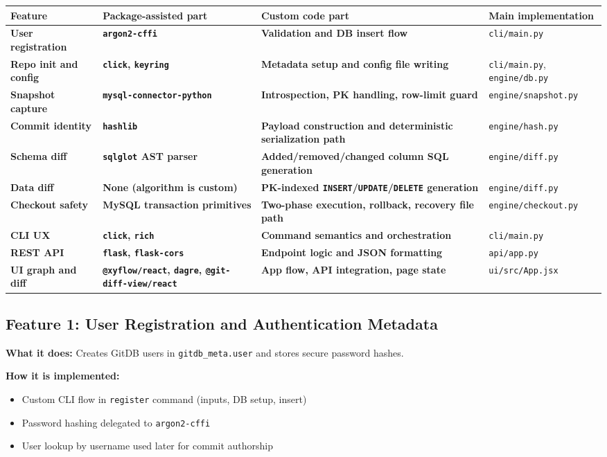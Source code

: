 \documentclass[12pt, a4paper]{article}
\begin{document}
\begin{center}
\renewcommand{\arraystretch}{1.35}
\begin{tabularx}{\textwidth}{>{\bfseries}p{3.0cm} >{\bfseries}p{3.2cm} >{\bfseries}p{3.2cm} X}
\toprule
Feature & Package-assisted part & Custom code part & Main implementation \\
\midrule
User registration & \texttt{argon2-cffi} & Validation and DB insert flow & \texttt{cli/main.py} \\
Repo init and config & \texttt{click}, \texttt{keyring} & Metadata setup and config file writing & \texttt{cli/main.py}, \texttt{engine/db.py} \\
Snapshot capture & \texttt{mysql-connector-python} & Introspection, PK handling, row-limit guard & \texttt{engine/snapshot.py} \\
Commit identity & \texttt{hashlib} & Payload construction and deterministic serialization path & \texttt{engine/hash.py} \\
Schema diff & \texttt{sqlglot} AST parser & Added/removed/changed column SQL generation & \texttt{engine/diff.py} \\
Data diff & None (algorithm is custom) & PK-indexed \texttt{INSERT}/\texttt{UPDATE}/\texttt{DELETE} generation & \texttt{engine/diff.py} \\
Checkout safety & MySQL transaction primitives & Two-phase execution, rollback, recovery file path & \texttt{engine/checkout.py} \\
CLI UX & \texttt{click}, \texttt{rich} & Command semantics and orchestration & \texttt{cli/main.py} \\
REST API & \texttt{flask}, \texttt{flask-cors} & Endpoint logic and JSON formatting & \texttt{api/app.py} \\
UI graph and diff & \texttt{@xyflow/react}, \texttt{dagre}, \texttt{@git-diff-view/react} & App flow, API integration, page state & \texttt{ui/src/App.jsx} \\
\bottomrule
\end{tabularx}
\end{center}

\subsection{Feature 1: User Registration and Authentication Metadata}

\textbf{What it does:}
Creates GitDB users in \texttt{gitdb\_meta.user} and stores secure password hashes.

\textbf{How it is implemented:}
\begin{itemize}[leftmargin=1.5em]
    \item Custom CLI flow in \texttt{register} command (inputs, DB setup, insert)
    \item Password hashing delegated to \texttt{argon2-cffi}
    \item User lookup by username used later for commit authorship
\end{itemize}
\end{document}
